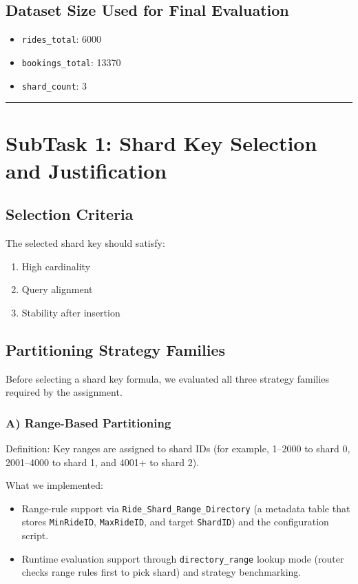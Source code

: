 \documentclass[12pt]{article}
\begin{document}
\subsection{Dataset Size Used for Final Evaluation}

\begin{itemize}
    \item \texttt{rides\_total}: 6000
    \item \texttt{bookings\_total}: 13370
    \item \texttt{shard\_count}: 3
\end{itemize}

\hrule
\vspace{0.75em}

\section{SubTask 1: Shard Key Selection and Justification}

\subsection{Selection Criteria}

The selected shard key should satisfy:
\begin{enumerate}
    \item High cardinality
    \item Query alignment
    \item Stability after insertion
\end{enumerate}

\subsection{Partitioning Strategy Families}

Before selecting a shard key formula, we evaluated all three strategy families required by the assignment.

\subsubsection*{A) Range-Based Partitioning}

Definition: Key ranges are assigned to shard IDs (for example, 1--2000 to shard 0, 2001--4000 to shard 1, and 4001+ to shard 2).

What we implemented:
\begin{itemize}
    \item Range-rule support via \texttt{Ride\_Shard\_Range\_Directory} (a metadata table that stores \texttt{MinRideID}, \texttt{MaxRideID}, and target \texttt{ShardID}) and the configuration script.
    \item Runtime evaluation support through \texttt{directory\_range} lookup mode (router checks range rules first to pick shard) and strategy benchmarking.
\end{itemize}
\end{document}
